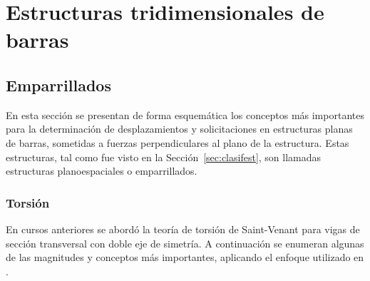 %
%
%

\chapter{Estructuras tridimensionales de barras}

\section{Emparrillados}

En esta sección se presentan de forma esquemática los conceptos más importantes para la determinación de desplazamientos y solicitaciones en estructuras planas de barras, sometidas a fuerzas perpendiculares al plano de la estructura. %
%
Estas estructuras, tal como fue visto en la Sección~\ref{sec:clasifest}, son llamadas estructuras planoespaciales o emparrillados.

\subsection{Torsión}


En cursos anteriores se abordó la teoría de torsión de Saint-Venant para vigas de sección transversal con doble eje de simetría. %
%
A continuación se enumeran algunas de las magnitudes y conceptos más importantes, aplicando el enfoque utilizado en \citep{Wunderlich2002}.

